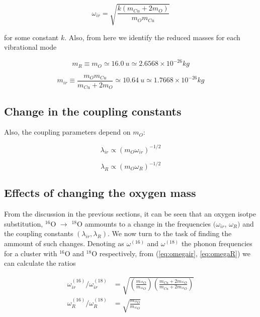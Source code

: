 \begin{equation}
  \label{eq:omegair}
  \omega_{ir} = \sqrt{\frac{k(m_{Cu}+2m_O)}{m_Om_{Cu}}}
\end{equation}

\noindent for some constant $k$.
Also, from here we identify the reduced masses for each vibrational mode

\begin{equation}
  \label{eq:redMassR}
  m_R \equiv m_O \simeq 16.0\ u \simeq 2.6568 \times 10^{-26} kg
\end{equation}

\begin{equation}
  \label{eq:redMassIr}
  m_{ir} \equiv \frac{m_Om_{Cu}}{m_{Cu}+2m_O} \simeq 10.64\ u \simeq 1.7668 \times 10^{-26}kg
\end{equation}

\subsection{Change in the coupling constants}

Also, the coupling parameters depend on $m_O$\cite{?}:

\begin{equation}
  \label{eq:ir-coupl-isot}
  \lambda_{ir}\propto (m_O\omega_{ir})^{-1/2}
\end{equation}

\begin{equation}
  \label{eq:Ram-coupl-isot}
  \lambda_R\propto (m_O\omega_{R})^{-1/2}
\end{equation}


\subsection{Effects of changing the oxygen mass}

From the discussion in the previous sections, it can be seen that an oxygen isotpe substitution, $^{16}$O $\rightarrow$ $^{18}$O ammounts to a change in the frequencies  $(\omega_{ir}$, $\omega_R)$ and the coupling constants $(\lambda_{ir},\lambda_R)$.
We now turn to the task of finding the ammount of such changes.
Denoting as $\omega^{(16)}$ and $\omega^{(18)}$ the phonon frequencies for a cluster with $^{16}$O and $^{18}$O respectively, from (\ref{eq:omegair}, \ref{eq:omegaR}) we can calculate the ratios

\begin{align}
  \omega^{(16)}_{ir}/\omega^{(18)}_{ir}
  & =\sqrt{\left(\frac{m_{^{18}O}}{m_{^{16}O}}\right)\left(\frac{m_{Cu}+2m_{^{16}O}}{m_{Cu}+2m_{^{18}O}}\right)} \\
  \omega^{(16)}_{R}/\omega^{(18)}_{R}
  & =\sqrt{\frac{m_{^{18}O}}{m_{^{16}O}}}
\end{align}

